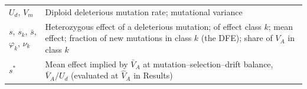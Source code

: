 \documentclass{article}
\begin{document}
\begin{longtable}{l>{\raggedright\arraybackslash}p{}}
$U_d$, $V_m$ & Diploid deleterious mutation rate; mutational variance \\
$s$, $s_k$, $\bar{s}$, $\varphi_k$, $\nu_k$ & Heterozygous effect of a deleterious mutation; of effect class $k$; mean effect; fraction of new mutations in class $k$ (the DFE); share of $V_A$ in class $k$ \\
$s^*$ & Mean effect implied by $\bar{V}_A$ at mutation--selection--drift balance, $\bar{V}_A/U_d$ (evaluated at $\hat{V}_A$ in Results) \\
\end{longtable}
\endgroup

\ifdefined\isMainDocument
\else
    
\end{document}
